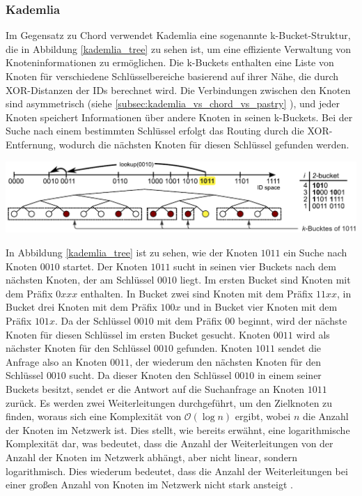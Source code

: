 \subsubsection{Kademlia}
Im Gegensatz zu Chord verwendet Kademlia eine sogenannte k-Bucket-Struktur, die in Abbildung \ref{kademlia_tree} zu sehen ist, um eine effiziente Verwaltung von Knoteninformationen zu ermöglichen. Die k-Buckets enthalten eine Liste von Knoten für verschiedene Schlüsselbereiche basierend auf ihrer Nähe, die durch XOR-Distanzen der IDs berechnet wird. Die Verbindungen zwischen den Knoten sind asymmetrisch (siehe \ref{subsec:kademlia_vs_chord_vs_pastry} \textit{}), und jeder Knoten speichert Informationen über andere Knoten in seinen k-Buckets. Bei der Suche nach einem bestimmten Schlüssel erfolgt das Routing durch die XOR-Entfernung, wodurch die nächsten Knoten für diesen Schlüssel gefunden werden.

\begin{center}
    \captionsetup{type=figure}
    \includegraphics[width=1\linewidth]{images/kademlia_tree_altered.png}
    \label{kademlia_tree}
\end{center}

\noindent In Abbildung \ref{kademlia_tree} ist zu sehen, wie der Knoten $1011$ ein Suche nach Knoten $0010$ startet. Der Knoten $1011$ sucht in seinen vier Buckets nach dem nächsten Knoten, der am Schlüssel $0010$ liegt. Im ersten Bucket sind Knoten mit dem Präfix $0xxx$ enthalten. In Bucket zwei sind Knoten mit dem Präfix $11xx$, in Bucket drei Knoten mit dem Präfix $100x$ und in Bucket vier Knoten mit dem Präfix $101x$. Da der Schlüssel $0010$ mit dem Präfix $00$ beginnt, wird der nächste Knoten für diesen Schlüssel im ersten Bucket gesucht. Knoten $0011$ wird als nächster Knoten für den Schlüssel $0010$ gefunden. Knoten $1011$ sendet die Anfrage also an Knoten $0011$, der wiederum den nächsten Knoten für den Schlüssel $0010$ sucht. Da dieser Knoten den Schlüssel $0010$ in einem seiner Buckets besitzt, sendet er die Antwort auf die Suchanfrage an Knoten $1011$ zurück. Es werden zwei Weiterleitungen durchgeführt, um den Zielknoten zu finden, woraus sich eine Komplexität von $\mathcal{O}(\log n)$ ergibt, wobei $n$ die Anzahl der Knoten im Netzwerk ist. Dies stellt, wie bereits erwähnt, eine logarithmische Komplexität dar, was bedeutet, dass die Anzahl der Weiterleitungen von der Anzahl der Knoten im Netzwerk abhängt, aber nicht linear, sondern logarithmisch. Dies wiederum bedeutet, dass die Anzahl der Weiterleitungen bei einer großen Anzahl von Knoten im Netzwerk nicht stark ansteigt \Parencite[S. 812]{MedranoChavez_ChordKademliaHighChurnScenarios}.


